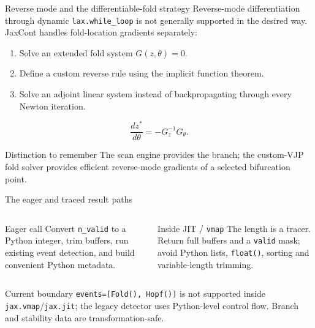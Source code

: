 \documentclass[aspectratio=169,10pt]{beamer}
\begin{document}
\begin{frame}{Reverse mode and the differentiable-fold strategy}
Reverse-mode differentiation through dynamic \texttt{lax.while\_loop} is not generally supported in the desired way.
JaxCont handles fold-location gradients separately:
\begin{enumerate}
  \item Solve an extended fold system $G(z,\theta)=0$.
  \item Define a custom reverse rule using the implicit function theorem.
  \item Solve an adjoint linear system instead of backpropagating through every Newton iteration.
\end{enumerate}
\[
  \frac{dz^*}{d\theta}=-G_z^{-1}G_{\theta}.
\]
\begin{block}{Distinction to remember}
The scan engine provides the branch; the custom-VJP fold solver provides efficient reverse-mode gradients of a selected bifurcation point.
\end{block}
\end{frame}

\begin{frame}{The eager and traced result paths}
\begin{columns}[T]
\begin{block}{Eager call}
Convert \texttt{n\_valid} to a Python integer, trim buffers, run existing event detection, and build convenient Python metadata.
\end{block}
\begin{block}{Inside JIT / \texttt{vmap}}
The length is a tracer. Return full buffers and a \texttt{valid} mask; avoid Python lists, \texttt{float()}, sorting and variable-length trimming.
\end{block}
\end{columns}
\vspace{5mm}
\begin{alertblock}{Current boundary}
\texttt{events=[Fold(), Hopf()]} is not supported inside \texttt{jax.vmap}/\texttt{jax.jit}; the legacy detector uses Python-level control flow. Branch and stability data are transformation-safe.
\end{alertblock}
\end{frame}
\end{document}

